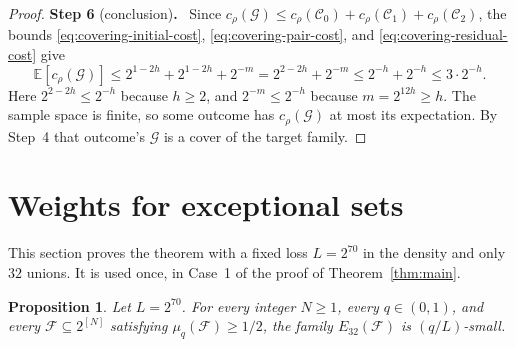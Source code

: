 \documentclass[11pt,letterpaper]{article}
\newtheorem{proposition}[theorem]{Proposition}
\theoremstyle{definition}
\theoremstyle{remark}
\numberwithin{equation}{section}
\newcommand{\step}[2]{\medskip\noindent\textbf{Step #1} (#2)\textbf{.}\ }
\begin{document}
\begin{proof}
\step{6}{conclusion}
Since $c_\rho(\mathcal G)\le c_\rho(\mathcal C_0)+c_\rho(\mathcal C_1)
+c_\rho(\mathcal C_2)$, the bounds \eqref{eq:covering-initial-cost},
\eqref{eq:covering-pair-cost}, and \eqref{eq:covering-residual-cost} give
\[
\mathbb E[c_\rho(\mathcal G)]
\le2^{1-2h}+2^{1-2h}+2^{-m}=2^{2-2h}+2^{-m}\le2^{-h}+2^{-h}\le3\cdot2^{-h}.
\]
Here $2^{2-2h}\le2^{-h}$ because $h\ge2$, and $2^{-m}\le2^{-h}$ because
$m=2^{12h}\ge h$. The sample space is finite, so some outcome has
$c_\rho(\mathcal G)$ at most its expectation. By Step~4 that outcome's
$\mathcal G$ is a cover of the target family.
\end{proof}

\section{Weights for exceptional sets}
\label{sec:weights}

This section proves the theorem with a fixed loss $L=2^{70}$ in the
density and only $32$ unions. It is used once, in Case~1 of the proof of
Theorem~\ref{thm:main}.

\begin{proposition}\label{prop:half-density}
Let $L=2^{70}$. For every integer $N\ge1$, every $q\in(0,1)$, and every
$\mathcal F\subseteq 2^{[N]}$ satisfying $\mu_q(\mathcal F)\ge1/2$,
the family $E_{32}(\mathcal F)$ is $(q/L)$-small.
\end{proposition}
\end{document}

